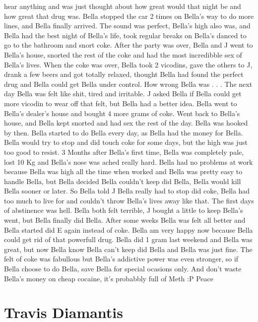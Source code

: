 \documentclass[12pt]{book}
\begin{document}
hear anything and was just thought about how great would that night be and how great that drug was. Bella stopped the car 2 times on Bella's way to do more lines, and Bella finally arrived. The sound was perfect, Bella's high also was, and Bella had the best night of Bella's life, took regular breaks on Bella's danced to go to the bathroom and snort coke. After the party was over, Bella and J went to Bella's house, snorted the rest of the coke and had the most incredibble sex of Bella's lives. When the coke was over, Bella took 2 vicodins, gave the others to J, drank a few beers and got totally relaxed, thought Bella had found the perfect drug and Bella could get Bella under control. How wrong Bella was . . .  The next day Bella was felt like shit, tired and irritable. J asked Bella if Bella could get more vicodin to wear off that felt, but Bella had a better idea. Bella went to Bella's dealer's house and bought 4 more grams of coke. Went back to Bella's house, and Bella kept snorted and had sex the rest of the day. Bella was hooked by then. Bella started to do Bella every day, as Bella had the money for Bella. Bella would try to stop and did touch coke for some days, but the high was just too good to resist. 3 Months after Bella's first time, Bella was completely pale, lost 10 Kg and Bella's nose was ached really hard. Bella had no problems at work because Bella was high all the time when worked and Bella was pretty easy to handle Bella, but Bella decided Bella couldn't keep did Bella, Bella would kill Bella sooner or later. So Bella told J Bella really had to stop did coke, Bella had too much to live for and couldn't throw Bella's lives away like that. The first days of abstinence was hell. Bella both felt terrible, J bought a little to keep Bella's went, but Bella finally did Bella. After some weeks Bella was felt all better and Bella started did E again instead of coke. Bella am very happy now because Bella could get rid of that powerfull drug. Bella did 1 gram last weekend and Bella was great, but now Bella know Bella can't keep did Bella and Bella was just fine. The felt of coke was fabullous but Bella's addictive power was even stronger, so if Bella choose to do Bella, save Bella for special ocasions only. And don't waste Bella's money on cheap cocaine, it's probabbly full of Meth :P Peace



\chapter{Travis Diamantis}
\end{document}
